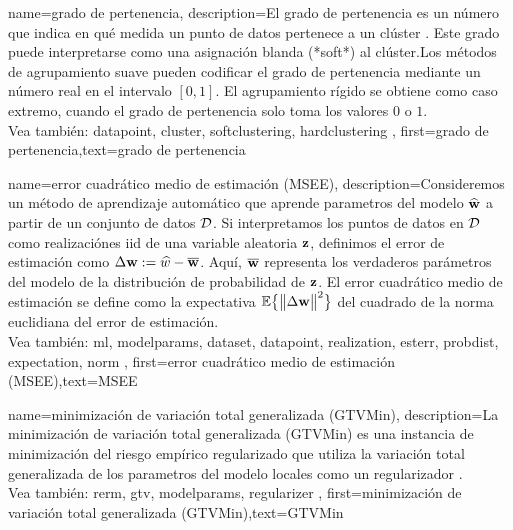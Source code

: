 {name={grado de pertenencia},
	description={El grado de pertenencia es un número que indica en qué medida un punto de datos 
		pertenece a un clúster \cite[Ch. 8]{MLBasics}. Este grado puede interpretarse 
		como una asignación blanda (*soft*) al clúster.Los métodos de agrupamiento suave
		pueden codificar el grado de pertenencia mediante un número real en el intervalo $[0,1]$. 
		El agrupamiento rígido se obtiene como caso extremo, cuando el grado de pertenencia solo toma los valores $0$ o $1$.
		\\
		Vea también: \gls{datapoint}, \gls{cluster}, \Gls{softclustering}, \Gls{hardclustering} }, 
		first={grado de pertenencia},text={grado de pertenencia} 
}

{name={error cuadrático medio de estimación (MSEE)},
	description={Consideremos un método de aprendizaje automático que aprende 
		parametros del modelo $\widehat{{\bf w}}$ a partir de un conjunto de datos $\mathcal{D}$. 
		Si interpretamos los puntos de datos en $\mathcal{D}$ como realizaciónes iid de una variable aleatoria ${\bf z}$, 
		definimos el error de estimación como $\Delta {\bf w} := \widehat{w} - \overline{{\bf w}}$. 
		Aquí, $\overline{{\bf w}}$ representa los verdaderos parámetros del modelo de la distribución de probabilidad 
		de ${\bf z}$. El error cuadrático medio de estimación se define como la expectativa $\mathbb{E} \big\{ \big\| \Delta {\bf w} \big\|^{2} \big\}$ del cuadrado de la 
		norma euclidiana del error de estimación\cite{LC,kay}.
		\\
		Vea también: \gls{ml}, \glspl{modelparam}, \gls{dataset}, \gls{datapoint}, \gls{realization}, \gls{esterr}, \gls{probdist}, \gls{expectation}, \gls{norm} },
	first={error cuadrático medio de estimación (MSEE)},text={MSEE} 
}

{name={minimización de variación total generalizada (GTVMin)},
	description={La minimización de variación total generalizada (GTVMin) es una instancia de minimización del riesgo empírico regularizado
	que utiliza la variación total generalizada de los parametros del modelo locales como un regularizador \cite{ClusteredFLTVMinTSP}.
	\\
		Vea también: \gls{rerm}, \gls{gtv}, \glspl{modelparam}, \gls{regularizer} },
	first={minimización de variación total generalizada (GTVMin)},text={GTVMin} 
}


